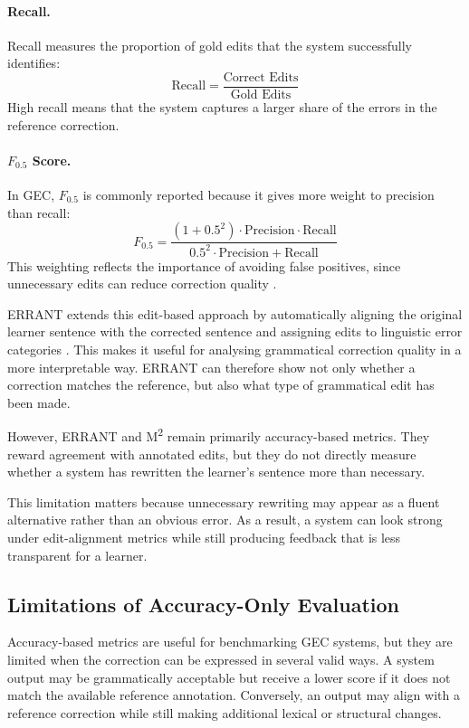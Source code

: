 \paragraph{Recall.}
Recall measures the proportion of gold edits that the system successfully identifies:
\[
\text{Recall} = \frac{\text{Correct Edits}}{\text{Gold Edits}}
\]
High recall means that the system captures a larger share of the errors in the reference correction.

\paragraph{$F_{0.5}$ Score.}
In GEC, $F_{0.5}$ is commonly reported because it gives more weight to precision than recall:
\[
F_{0.5} =
\frac{(1 + 0.5^2)\cdot \text{Precision} \cdot \text{Recall}}
{0.5^2 \cdot \text{Precision} + \text{Recall}}
\]
This weighting reflects the importance of avoiding false positives, since unnecessary edits can reduce correction quality \cite{ng-etal-2014-conll}.

ERRANT extends this edit-based approach by automatically aligning the original learner sentence with the corrected sentence and assigning edits to linguistic error categories \cite{bryant-etal-2017-automatic}. This makes it useful for analysing grammatical correction quality in a more interpretable way. ERRANT can therefore show not only whether a correction matches the reference, but also what type of grammatical edit has been made.

However, ERRANT and M\textsuperscript{2} remain primarily accuracy-based metrics. They reward agreement with annotated edits, but they do not directly measure whether a system has rewritten the learner's sentence more than necessary.

This limitation matters because unnecessary rewriting may appear as a fluent alternative rather than an obvious error. As a result, a system can look strong under edit-alignment metrics while still producing feedback that is less transparent for a learner.

\subsection{Limitations of Accuracy-Only Evaluation}

Accuracy-based metrics are useful for benchmarking GEC systems, but they are limited when the correction can be expressed in several valid ways. A system output may be grammatically acceptable but receive a lower score if it does not match the available reference annotation. Conversely, an output may align with a reference correction while still making additional lexical or structural changes.

